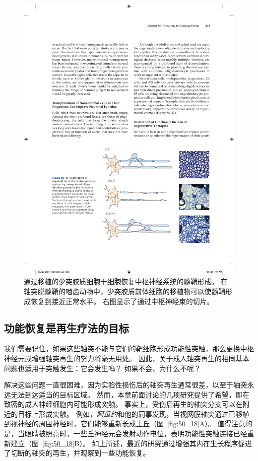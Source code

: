 \begin{figure}[htbp]
	\centering
	\includegraphics[width=0.75\linewidth]{chap50/fig_50_17}
	\caption{通过移植的少突胶质细胞干细胞恢复中枢神经系统的髓鞘形成。
		在轴突脱髓鞘的啮齿动物中，少突胶质前体细胞的移植物可以使髓鞘形成恢复到接近正常水平。
		右图显示了通过中枢神经束的切片\cite{franklin2008remyelination}。}
	\label{fig:50_17}
\end{figure}


\subsection{功能恢复是再生疗法的目标}

我们需要记住，如果这些轴突不能与它们的靶细胞形成功能性突触，那么更换中枢神经元或增强轴突再生的努力将毫无用处。
因此，关于成人轴突再生的相同基本问题也适用于突触发生：它会发生吗？
如果不会，为什么不呢？


解决这些问题一直很困难，因为实验性损伤后的轴突再生通常很差，以至于轴突永远无法到达适当的目标区域。
然而，本章前面讨论的几项研究提供了希望，即在致密的成人神经细胞内可能形成突触。
事实上，受伤后再生的轴突分支可以在附近的目标上形成突触。
例如，\textit{阿瓜约}和他的同事发现，当视网膜轴突通过已移植到视神经的周围神经时，它们能够重新长成上丘（图~\ref{fig:50_18}A）。
值得注意的是，当眼睛被照亮时，一些丘神经元会发射动作电位，表明功能性突触连接已经重新建立（图~\ref{fig:50_18}B）。
如上所述，最近的研究通过增强其内在生长程序促进了切断的轴突的再生，并观察到一些功能恢复。


